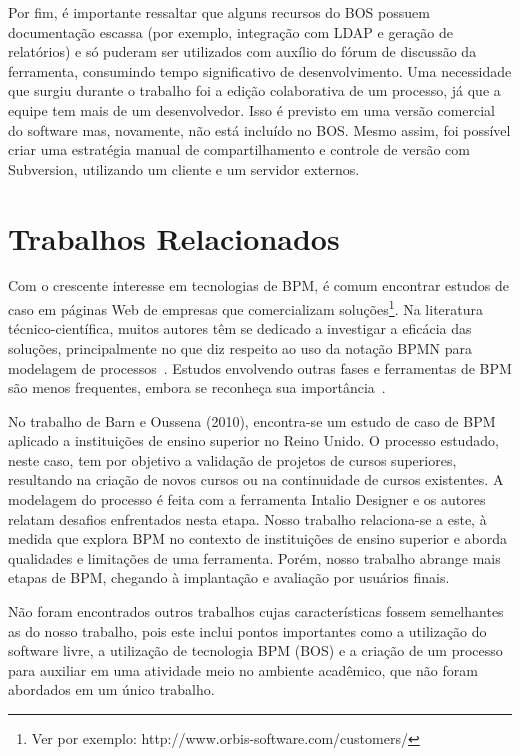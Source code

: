 \documentclass[12pt]{article}
\begin{document}
Por fim, é importante ressaltar que alguns recursos do BOS possuem documentação escassa (por exemplo, integração com LDAP e geração de relatórios) e só puderam ser utilizados com auxílio do fórum de discussão da ferramenta, consumindo tempo significativo de desenvolvimento. Uma necessidade que surgiu durante o trabalho foi a edição colaborativa de um processo, já que a equipe tem mais de um desenvolvedor. Isso é previsto em uma versão comercial do software mas, novamente, não está incluído no BOS. Mesmo assim, foi possível criar uma estratégia manual de compartilhamento e controle de versão com Subversion, utilizando um cliente e um servidor externos.

\section{Trabalhos Relacionados}

Com o crescente interesse em tecnologias de BPM, é comum encontrar estudos de caso em páginas Web de empresas que comercializam soluções\footnote{Ver por exemplo: http://www.orbis-software.com/customers/}. Na literatura técnico-científica, muitos autores têm se dedicado a investigar a eficácia das soluções, principalmente no que diz respeito ao uso da notação BPMN para modelagem de processos~\cite{recker2006, muehlen2008, ostroski-sbsi2012}. Estudos envolvendo outras fases e ferramentas de BPM são menos frequentes, embora se reconheça sua importância~\cite{SORDI2007, wohed2009patterns}.

No trabalho de Barn e Oussena (2010), encontra-se um estudo de caso de BPM aplicado a instituições de ensino superior no Reino Unido. O processo estudado, neste caso, tem por objetivo a validação de projetos de cursos superiores, resultando na criação de novos cursos ou na continuidade de cursos existentes. A modelagem do processo é feita com a ferramenta Intalio Designer e os autores relatam desafios enfrentados nesta etapa. Nosso trabalho relaciona-se a este, à medida que explora BPM no contexto de instituições de ensino superior e aborda qualidades e limitações de uma ferramenta. Porém, nosso trabalho abrange mais etapas de BPM, chegando à implantação e avaliação por usuários finais.

Não foram encontrados outros trabalhos cujas características fossem semelhantes as do nosso trabalho, pois este inclui pontos importantes como a utilização do software livre, a utilização de tecnologia BPM (BOS) e a criação de um processo para auxiliar em uma atividade meio no ambiente acadêmico, que não foram abordados em um único trabalho. 
\end{document}
